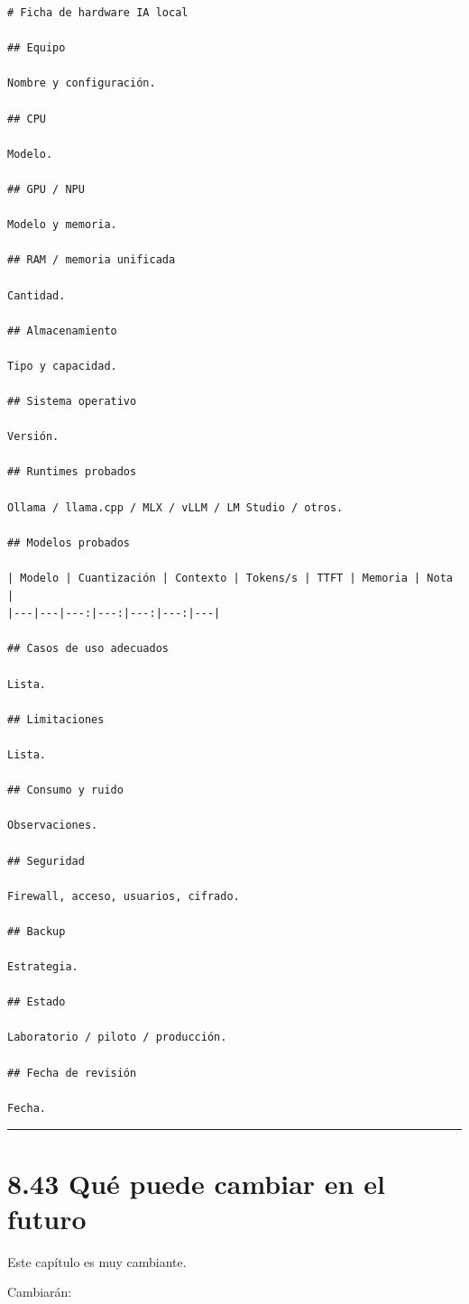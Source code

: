 \begin{lstlisting}
# Ficha de hardware IA local

## Equipo

Nombre y configuración.

## CPU

Modelo.

## GPU / NPU

Modelo y memoria.

## RAM / memoria unificada

Cantidad.

## Almacenamiento

Tipo y capacidad.

## Sistema operativo

Versión.

## Runtimes probados

Ollama / llama.cpp / MLX / vLLM / LM Studio / otros.

## Modelos probados

| Modelo | Cuantización | Contexto | Tokens/s | TTFT | Memoria | Nota |
|---|---|---:|---:|---:|---:|---|

## Casos de uso adecuados

Lista.

## Limitaciones

Lista.

## Consumo y ruido

Observaciones.

## Seguridad

Firewall, acceso, usuarios, cifrado.

## Backup

Estrategia.

## Estado

Laboratorio / piloto / producción.

## Fecha de revisión

Fecha.
\end{lstlisting}

\begin{center}\rule{0.5\linewidth}{0.5pt}\end{center}

\section{8.43 Qué puede cambiar en el
futuro}\label{quuxe9-puede-cambiar-en-el-futuro-7}

Este capítulo es muy cambiante.

Cambiarán:

